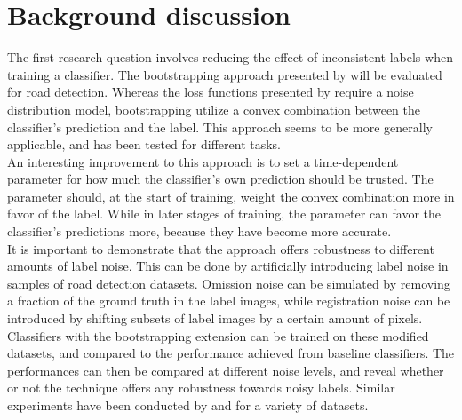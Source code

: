 \section{Background discussion}
\label{sec:backgroundDiscussion}
 The first research question involves reducing the effect of inconsistent labels when training a classifier. The bootstrapping approach presented by \cite{Reed_noisy_labels_bootstrapping} will be evaluated for road detection. Whereas the loss functions presented by \citep{Mnih_aerial_images_noisy} require a noise distribution model,  bootstrapping utilize a   convex combination between the classifier's prediction and the label. This approach seems to be more generally applicable, and has been tested for different tasks.\\

 An interesting improvement to this approach is to set a time-dependent parameter for how much the classifier's own prediction should be trusted. The parameter should, at the start of training, weight the convex combination more in favor of the label. While in later stages of training, the parameter can favor the classifier's predictions more, because they have become more accurate.\\

It is important to demonstrate that the approach offers robustness to different amounts of label noise. This can be done by artificially introducing label noise in samples of road detection datasets. Omission noise can be simulated by removing a fraction of the ground truth in the label images, while registration noise can be introduced by shifting subsets of label images by a certain amount of pixels. Classifiers with the bootstrapping extension can be trained on these modified datasets, and compared to the performance achieved from baseline classifiers. The performances can then be compared at different noise levels, and reveal whether or not the technique offers any robustness towards noisy labels. Similar experiments have been conducted by \citep{Sukhbaatar_noisy_network_learning} and \citep{Reed_noisy_labels_bootstrapping} for a variety of datasets. \\

